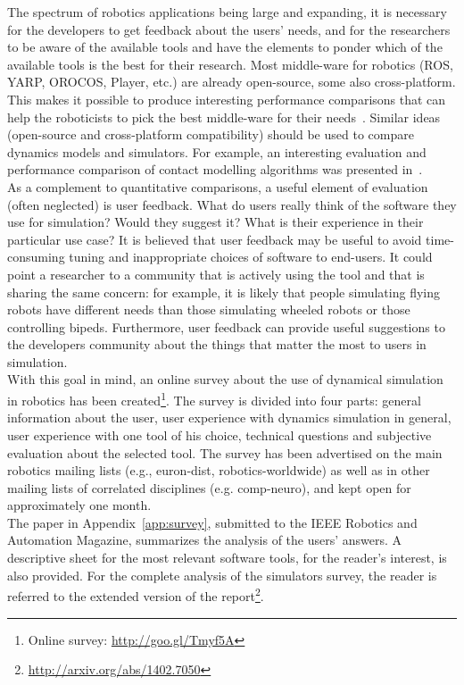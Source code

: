 \documentclass[12pt,a4paper,twoside]{article}
\newcommand{\REPORTARXIV}{\href{http://arxiv.org/abs/1402.7050}{http://arxiv.org/abs/1402.7050}}
\begin{document}
The spectrum of robotics applications being large and expanding, it is necessary for the developers to get feedback about the users' needs, and for the researchers to be aware of the available tools and have the elements to ponder which of the available tools is the best for their research. Most middle-ware for robotics (ROS, YARP, OROCOS, Player, etc.) are already open-source, some also cross-platform. This makes it possible to produce interesting performance comparisons that can help the roboticists to pick the best middle-ware for their needs~\cite{Einhorn2012}. Similar ideas (open-source and cross-platform compatibility) should be used to compare dynamics models and simulators. For example, an interesting evaluation and performance comparison of contact modelling algorithms was presented in~\cite{Drumwright2011,Drumwright2012}.\\

As a complement to quantitative comparisons, a useful element of evaluation (often neglected) is user feedback. What do users really think of the software they use for simulation? Would they suggest it? What is their experience in their particular use case? It is believed that user feedback may be useful to avoid time-consuming tuning and inappropriate choices of software to end-users. It could point a researcher to a community that is actively using the tool and that is sharing the same concern: for example, it is likely that people simulating flying robots have different needs than those simulating wheeled robots or those controlling bipeds. Furthermore, user feedback can provide useful suggestions to the developers community about the things that matter the most to users in simulation.\\

With this goal in mind, an online survey about the use of dynamical simulation in robotics has been created\footnote{Online survey: \url{http://goo.gl/Tmyf5A}}.
The survey is divided into four parts: general information about the user, user experience with dynamics simulation in general, user experience with one tool of his choice, technical questions and subjective evaluation about the selected tool. The survey has been advertised on the main robotics mailing lists (e.g., euron-dist, robotics-worldwide) as well as in other mailing lists of correlated disciplines (e.g. comp-neuro), and kept open for approximately one month.\\

The paper in Appendix~\ref{app:survey}, submitted to the IEEE Robotics and Automation Magazine, summarizes the analysis of the users' answers. A descriptive sheet for the most relevant software tools, for the reader's interest, is also provided. For the complete analysis of the simulators survey, the reader is referred to the extended version of the report\footnote{\REPORTARXIV}.\\
\end{document}
